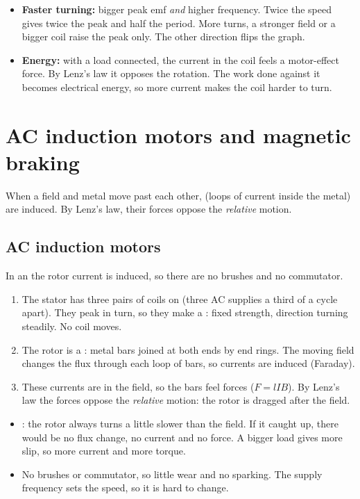 \begin{itemize}
  \item \textbf{Faster turning:} bigger peak emf \emph{and} higher frequency. Twice the
        speed gives twice the peak and half the period. More turns, a stronger field or
        a bigger coil raise the peak only. The other direction flips the graph.
  \item \textbf{Energy:} with a load connected, the current in the coil feels a
        motor-effect force. By Lenz's law it opposes the rotation. The work done against
        it becomes electrical energy, so more current makes the coil harder to turn.
\end{itemize}

\section{AC induction motors and magnetic braking}\label{ch5:sec:induction}

\begin{bigidea}
When a field and metal move past each other,  (loops of current
inside the metal) are induced. By Lenz's law, their forces oppose the \emph{relative}
motion.
\end{bigidea}

\subsection{AC induction motors}
In an  the rotor current is induced, so there are no brushes
and no commutator.
\begin{enumerate}
  \item The stator has three pairs of coils on  (three AC supplies
        a third of a cycle apart). They peak in turn, so they make a : fixed strength, direction turning steadily. No coil moves.
  \item The rotor is a : metal bars joined at both ends by end
        rings. The moving field changes the flux through each loop of bars, so currents
        are induced (Faraday).
  \item These currents are in the field, so the bars feel forces ($F = lIB$). By Lenz's
        law the forces oppose the \emph{relative} motion: the rotor is dragged after
        the field.
\end{enumerate}
\begin{itemize}
  \item {}: the rotor always turns a little slower than the field. If it caught
        up, there would be no flux change, no current and no force. A bigger load gives
        more slip, so more current and more torque.
  \item No brushes or commutator, so little wear and no sparking. The supply frequency
        sets the speed, so it is hard to change.
\end{itemize}

